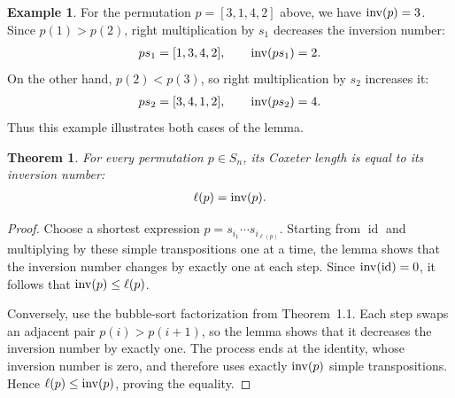 \documentclass[reqno,11pt]{amsart}
\theoremstyle{definition}
\newtheorem{example}{Example}[section]
\theoremstyle{plain}
\newtheorem{theorem}{Theorem}[section]
\theoremstyle{remark}
\numberwithin{equation}{section}
\newcommand{\id}{\operatorname{id}}
\newcommand{\be}{\begin{eqnarray}}
\newcommand{\ee}{\end{eqnarray}}
\begin{document}
\begin{example}
For the permutation $p=[3,1,4,2]$ above, we have $\mathrm{inv}(p)=3$. Since
$p(1)>p(2)$, right multiplication by $s_1$ decreases the inversion number:
\be
ps_1=[1,3,4,2],
\qquad
\inv(ps_1)=2.
\ee
On the other hand, $p(2)<p(3)$, so right multiplication by $s_2$ increases it:
\be
ps_2=[3,4,1,2],
\qquad
\inv(ps_2)=4.
\ee
Thus this example illustrates both cases of the lemma.
\end{example}

\begin{theorem}
For every permutation $p\in S_n$, its Coxeter length is equal to its inversion
number:
\be
\ell(p)=\inv(p).
\ee
\end{theorem}

\begin{proof}
Choose a shortest expression $p=s_{i_1}\cdots s_{i_{\ell(p)}}$. Starting from
$\id$ and multiplying by these simple transpositions one at a time, the lemma
shows that the inversion number changes by exactly one at each step. Since
$\inv(\id)=0$, it follows that $\mathrm{inv}(p)\leq\ell(p)$.

Conversely, use the bubble-sort factorization from Theorem~1.1. Each step
swaps an adjacent pair $p(i)>p(i+1)$, so the lemma shows that it decreases the
inversion number by exactly one. The process ends at the identity, whose
inversion number is zero, and therefore uses exactly $\mathrm{inv}(p)$ simple
transpositions. Hence $\ell(p)\leq\mathrm{inv}(p)$, proving the equality.
\end{proof}
\end{document}

